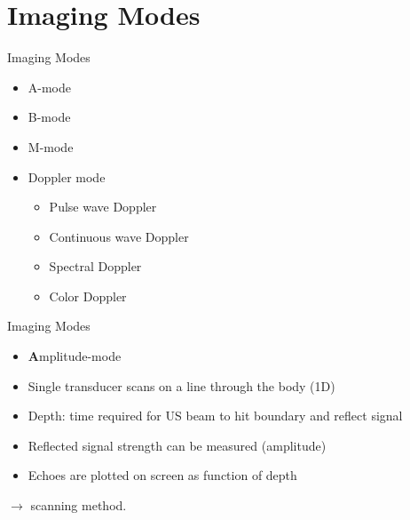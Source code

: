\section{Imaging Modes}


\begin{frame}{Imaging Modes}

    \begin{itemize}
        \setlength\itemsep{0.3cm}
        \item A-mode
        \item B-mode
        \item M-mode
        \item Doppler mode
              \begin{itemize}
        \setlength\itemsep{0.1cm}
                  \item Pulse wave Doppler
                  \item Continuous wave Doppler
                  \item Spectral Doppler
                  \item Color Doppler
              \end{itemize}
    \end{itemize}

\end{frame}


\begin{frame}{Imaging Modes \cont}

    \begin{itemize}
        \item \textbf{A}mplitude-mode
        \item Single transducer scans on a line through the body (1D)
        \item Depth: time required for US beam to hit boundary and reflect signal
        \item Reflected signal strength can be measured (amplitude)
        \item Echoes are plotted on screen as function of depth
    \end{itemize}

    \vspace{1cm}
    $\rightarrow$  scanning method.

\end{frame}


